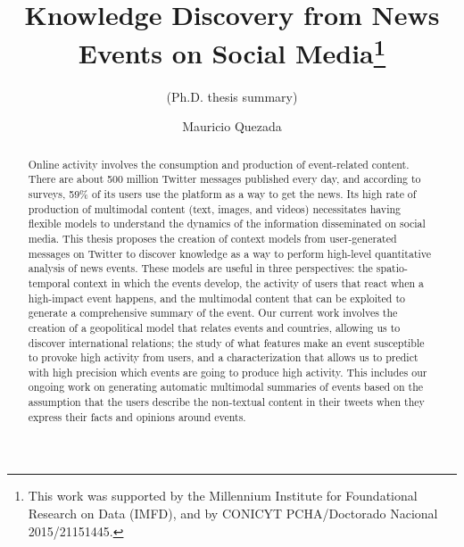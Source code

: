 \documentclass[runningheads]{llncs}
\begin{document}
%
\title{Knowledge Discovery from News Events on Social Media\thanks{This work was
supported by the Millennium Institute for Foundational Research on Data (IMFD),
and by CONICYT PCHA/Doctorado Nacional 2015/21151445.}}
\subtitle{(Ph.D. thesis summary)}
%
%
\author{Mauricio Quezada}
%
%
%
\maketitle              %

{\let\thefootnote\relax{}}


%
\begin{abstract}
    Online activity involves the consumption and production of event-related
    content. 
    There are about 500 million Twitter messages published every day, and
    according to surveys, 59\% of its users use the platform as a way to get the
    news. 
    Its high rate of production of multimodal content (text, images, and videos)
    necessitates having flexible models to understand the dynamics of
    the information disseminated on social media. 
    This thesis proposes the creation of context models from user-generated
    messages on Twitter to discover knowledge as a way to perform high-level
    quantitative analysis of news events. 
    These models are useful in three perspectives: the
    spatio-temporal context in which the events develop, the activity of users
    that react when a high-impact event happens, and the multimodal content that
    can be exploited to generate a comprehensive summary of the event. 
    Our current work involves the creation of a geopolitical model that relates
    events and countries, allowing us to discover international relations; 
    the study of what features make an event susceptible to provoke high
    activity from users, and a characterization that allows us to predict with
    high precision which events are going to produce high activity. 
    This includes our ongoing work on generating automatic multimodal summaries
    of events based on the assumption that the users describe the non-textual
    content in their tweets when they express their facts and opinions around
    events.

\end{abstract}
\end{document}
